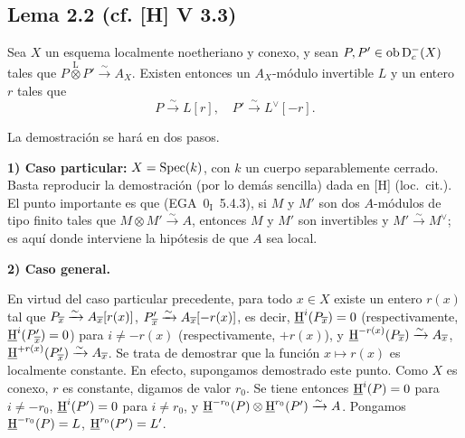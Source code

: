 \subsection*{Lema 2.2 (cf. [H] V 3.3)}
Sea $X$ un esquema localmente noetheriano y conexo, y sean $P, P' \in \operatorname{ob} \mathrm{D}_c^{-}(X)$ tales que $P \mathop{\otimes}\limits^{\mathrm{L}} P' \xrightarrow{\sim} A_X$. Existen entonces un $A_X$-módulo invertible $L$ y un entero $r$ tales que
\[
P \xrightarrow{\sim} L[r], \quad P' \xrightarrow{\sim} L^{\vee}[-r].
\]

La demostración se hará en dos pasos.

\textbf{1) Caso particular:} $X = \operatorname{Spec}(k)$, con $k$ un cuerpo separablemente cerrado. Basta reproducir la demostración (por lo demás sencilla) dada en [H] (loc.~cit.). El punto importante es que (EGA~$0_{\mathrm{I}}$~5.4.3), si $M$ y $M'$ son dos $A$-módulos de tipo finito tales que $M \otimes M' \xrightarrow{\sim} A$, entonces $M$ y $M'$ son invertibles y $M' \xrightarrow{\sim} M^{\vee}$; es aquí donde interviene la hipótesis de que $A$ sea local.

\textbf{2) Caso general.}

En virtud del caso particular precedente, para todo $x \in X$ existe un entero $r(x)$ tal que $P_{\overline{x}} \xrightarrow{\sim} A_{\overline{x}}[r(x)]$, $P'_{\overline{x}} \xrightarrow{\sim} A_{\overline{x}}[-r(x)]$, es decir, $\underline{\mathrm H}^i(P_{\overline{x}}) = 0$ (respectivamente, $\underline{\mathrm H}^i(P'_{\overline{x}}) = 0$) para $i \neq -r(x)$ (respectivamente, $+r(x)$), y $\underline{\mathrm H}^{-r(x)}(P_{\overline{x}}) \xrightarrow{\sim} A_{\overline{x}}$, $\underline{\mathrm H}^{+r(x)}(P'_{\overline{x}}) \xrightarrow{\sim} A_{\overline{x}}$. Se trata de demostrar que la función $x \mapsto r(x)$ es localmente constante. En efecto, supongamos demostrado este punto. Como $X$ es conexo, $r$ es constante, digamos de valor $r_0$. Se tiene entonces $\underline{\mathrm H}^i(P) = 0$ para $i \neq -r_0$, $\underline{\mathrm H}^i(P') = 0$ para $i \neq r_0$, y $\underline{\mathrm H}^{-r_0}(P) \otimes \underline{\mathrm H}^{r_0}(P') \xrightarrow{\sim} A$. Pongamos $\underline{\mathrm H}^{-r_0}(P) = L$, $\underline{\mathrm H}^{r_0}(P') = L'$.

